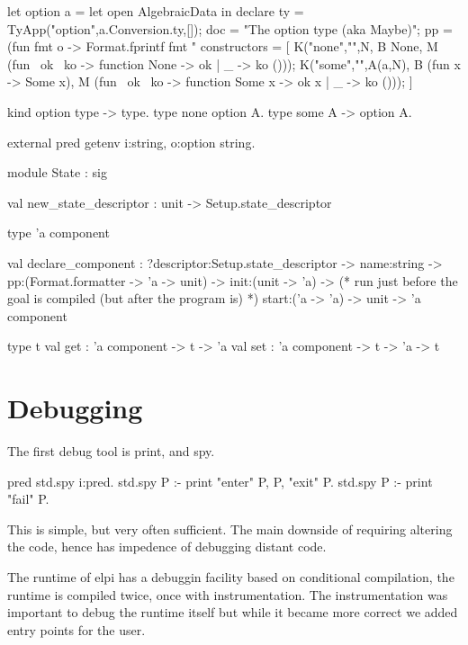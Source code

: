 \documentclass[a4paper, 11pt]{book}
\begin{document}
\begin{ocamlcode}
let option a = let open AlgebraicData in declare {
  ty = TyApp("option",a.Conversion.ty,[]);
  doc = "The option type (aka Maybe)";
  pp = (fun fmt o -> Format.fprintf fmt "%
  constructors = [
    K("none","",N,
      B None,
      M (fun ~ok ~ko -> function None -> ok | _ -> ko ())); 
    K("some","",A(a,N),
      B (fun x -> Some x),
      M (fun ~ok ~ko -> function Some x -> ok x | _ -> ko ())); 
  ]
}
\end{ocamlcode}

\begin{elpicode}
kind option type -> type.
type none option A.
type some A -> option A.

external pred getenv i:string, o:option string.
\end{elpicode}

\begin{ocamlcode}
module State : sig

  val new_state_descriptor : unit -> Setup.state_descriptor

  type 'a component

  val declare_component :
    ?descriptor:Setup.state_descriptor ->
    name:string ->
    pp:(Format.formatter -> 'a -> unit) ->
    init:(unit -> 'a) ->
    (* run just before the goal is compiled (but after the program is) *)
    start:('a -> 'a) ->
    unit ->
      'a component
  
  type t
  val get : 'a component -> t -> 'a
  val set : 'a component -> t -> 'a -> t
\end{ocamlcode}


\section{Debugging}

The first debug tool is print, and spy.

\begin{elpicode}
pred std.spy i:pred.
std.spy P :- print "enter" P, P, "exit" P.
std.spy P :- print "fail" P.
\end{elpicode}

This is simple, but very often sufficient.
The main downside of requiring altering the code, hence has impedence
of debugging distant code.

The runtime of elpi has a debuggin facility based on conditional compilation,
the runtime is compiled twice, once with instrumentation.
The instrumentation was important to debug the runtime itself
but while it became more correct we added entry points for the user.
\end{document}
